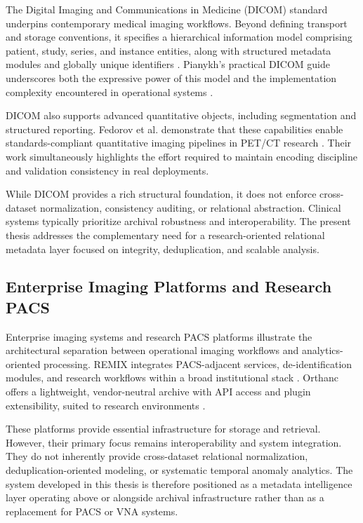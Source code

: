 The Digital Imaging and Communications in Medicine (DICOM) standard underpins contemporary medical imaging workflows. Beyond defining transport and storage conventions, it specifies a hierarchical information model comprising patient, study, series, and instance entities, along with structured metadata modules and globally unique identifiers \cite{dicom}. Pianykh's practical DICOM guide underscores both the expressive power of this model and the implementation complexity encountered in operational systems \cite{pacs}.

DICOM also supports advanced quantitative objects, including segmentation and structured reporting. Fedorov et al. demonstrate that these capabilities enable standards-compliant quantitative imaging pipelines in PET/CT research \cite{fedorov_qin}. Their work simultaneously highlights the effort required to maintain encoding discipline and validation consistency in real deployments.

While DICOM provides a rich structural foundation, it does not enforce cross-dataset normalization, consistency auditing, or relational abstraction. Clinical systems typically prioritize archival robustness and interoperability. The present thesis addresses the complementary need for a research-oriented relational metadata layer focused on integrity, deduplication, and scalable analysis.

\subsection{Enterprise Imaging Platforms and Research PACS}

Enterprise imaging systems and research PACS platforms illustrate the architectural separation between operational imaging workflows and analytics-oriented processing. REMIX integrates PACS-adjacent services, de-identification modules, and research workflows within a broad institutional stack \cite{erdal_remix}. Orthanc offers a lightweight, vendor-neutral archive with API access and plugin extensibility, suited to research environments \cite{orthanc}.

These platforms provide essential infrastructure for storage and retrieval. However, their primary focus remains interoperability and system integration. They do not inherently provide cross-dataset relational normalization, deduplication-oriented modeling, or systematic temporal anomaly analytics. The system developed in this thesis is therefore positioned as a metadata intelligence layer operating above or alongside archival infrastructure rather than as a replacement for PACS or VNA systems.

